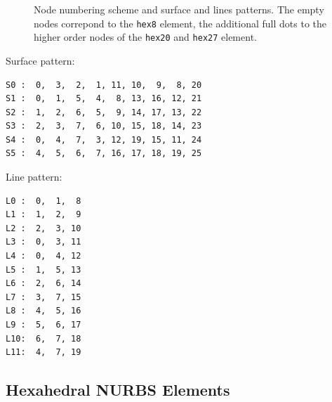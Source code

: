\begin{figure}[h!]
\begin{center}
\caption{Node numbering scheme and surface and lines patterns. The empty nodes correpond to the \texttt{hex8} element, the additional full dots to the higher order nodes of the \texttt{hex20} and \texttt{hex27} element.}
\label{fig:conventions:hex}
\end{center}
\end{figure}

Surface pattern:
\begin{verbatim}
S0 :  0,  3,  2,  1, 11, 10,  9,  8, 20
S1 :  0,  1,  5,  4,  8, 13, 16, 12, 21
S2 :  1,  2,  6,  5,  9, 14, 17, 13, 22
S3 :  2,  3,  7,  6, 10, 15, 18, 14, 23
S4 :  0,  4,  7,  3, 12, 19, 15, 11, 24
S5 :  4,  5,  6,  7, 16, 17, 18, 19, 25
\end{verbatim}

Line pattern:
\begin{verbatim}
L0 :  0,  1,  8
L1 :  1,  2,  9
L2 :  2,  3, 10
L3 :  0,  3, 11
L4 :  0,  4, 12
L5 :  1,  5, 13
L6 :  2,  6, 14
L7 :  3,  7, 15
L8 :  4,  5, 16
L9 :  5,  6, 17
L10:  6,  7, 18
L11:  4,  7, 19
\end{verbatim}

\newpage
\subsection{Hexahedral NURBS Elements}

